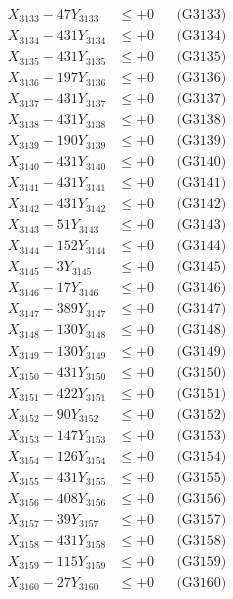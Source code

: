 \documentclass[a4paper,10pt]{article}
\begin{document}
{\begin{align}
X_{3133} - 47Y_{3133} &\leq +0 && \text{(G3133)} \\
X_{3134} - 431Y_{3134} &\leq +0 && \text{(G3134)} \\
X_{3135} - 431Y_{3135} &\leq +0 && \text{(G3135)} \\
X_{3136} - 197Y_{3136} &\leq +0 && \text{(G3136)} \\
X_{3137} - 431Y_{3137} &\leq +0 && \text{(G3137)} \\
X_{3138} - 431Y_{3138} &\leq +0 && \text{(G3138)} \\
X_{3139} - 190Y_{3139} &\leq +0 && \text{(G3139)} \\
X_{3140} - 431Y_{3140} &\leq +0 && \text{(G3140)} \\
\allowbreak
X_{3141} - 431Y_{3141} &\leq +0 && \text{(G3141)} \\
X_{3142} - 431Y_{3142} &\leq +0 && \text{(G3142)} \\
X_{3143} - 51Y_{3143} &\leq +0 && \text{(G3143)} \\
X_{3144} - 152Y_{3144} &\leq +0 && \text{(G3144)} \\
X_{3145} - 3Y_{3145} &\leq +0 && \text{(G3145)} \\
X_{3146} - 17Y_{3146} &\leq +0 && \text{(G3146)} \\
X_{3147} - 389Y_{3147} &\leq +0 && \text{(G3147)} \\
X_{3148} - 130Y_{3148} &\leq +0 && \text{(G3148)} \\
X_{3149} - 130Y_{3149} &\leq +0 && \text{(G3149)} \\
X_{3150} - 431Y_{3150} &\leq +0 && \text{(G3150)} \\
\allowbreak
X_{3151} - 422Y_{3151} &\leq +0 && \text{(G3151)} \\
X_{3152} - 90Y_{3152} &\leq +0 && \text{(G3152)} \\
X_{3153} - 147Y_{3153} &\leq +0 && \text{(G3153)} \\
X_{3154} - 126Y_{3154} &\leq +0 && \text{(G3154)} \\
X_{3155} - 431Y_{3155} &\leq +0 && \text{(G3155)} \\
X_{3156} - 408Y_{3156} &\leq +0 && \text{(G3156)} \\
X_{3157} - 39Y_{3157} &\leq +0 && \text{(G3157)} \\
X_{3158} - 431Y_{3158} &\leq +0 && \text{(G3158)} \\
X_{3159} - 115Y_{3159} &\leq +0 && \text{(G3159)} \\
X_{3160} - 27Y_{3160} &\leq +0 && \text{(G3160)} \\

\end{align}}
\end{document}
